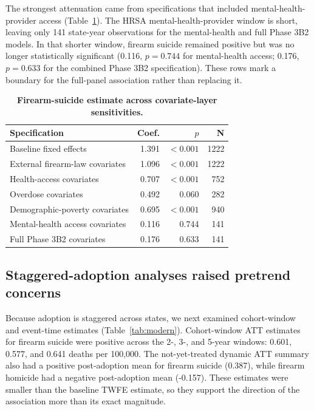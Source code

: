 \documentclass[11pt]{article}
\begin{document}
The strongest attenuation came from specifications that included mental-health-provider access (Table~\ref{tab:sensitivity}). The HRSA mental-health-provider window is short, leaving only 141 state-year observations for the mental-health and full Phase 3B2 models. In that shorter window, firearm suicide remained positive but was no longer statistically significant (0.116, $p=0.744$ for mental-health access; 0.176, $p=0.633$ for the combined Phase 3B2 specification). These rows mark a boundary for the full-panel association rather than replacing it.

\begin{table}[H]
\centering
\caption{\textbf{Firearm-suicide estimate across covariate-layer sensitivities.}}
\label{tab:sensitivity}
\begin{tabular}{lrrr}
\toprule
Specification & Coef. & $p$ & N \\
\midrule
Baseline fixed effects & 1.391 & $<0.001$ & 1222 \\
External firearm-law covariates & 1.096 & $<0.001$ & 1222 \\
Health-access covariates & 0.707 & $<0.001$ & 752 \\
Overdose covariates & 0.492 & 0.060 & 282 \\
Demographic-poverty covariates & 0.695 & $<0.001$ & 940 \\
Mental-health access covariates & 0.116 & 0.744 & 141 \\
Full Phase 3B2 covariates & 0.176 & 0.633 & 141 \\
\bottomrule
\end{tabular}
\end{table}

\subsection*{Staggered-adoption analyses raised pretrend concerns}

Because adoption is staggered across states, we next examined cohort-window and event-time estimates (Table~\ref{tab:modern}). Cohort-window ATT estimates for firearm suicide were positive across the 2-, 3-, and 5-year windows: 0.601, 0.577, and 0.641 deaths per 100,000. The not-yet-treated dynamic ATT summary also had a positive post-adoption mean for firearm suicide (0.387), while firearm homicide had a negative post-adoption mean (-0.157). These estimates were smaller than the baseline TWFE estimate, so they support the direction of the association more than its exact magnitude.
\end{document}
